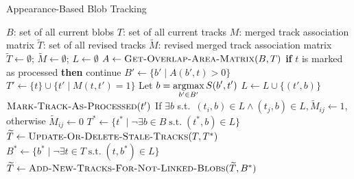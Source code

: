 \renewcommand{\algorithmicrequire}{\textbf{Input:}}
\renewcommand{\algorithmicensure}{\textbf{Output:}}
\renewcommand{\algorithmicforall}{\textbf{for each}}
\begin{algorithm}
\caption{Appearance-Based Blob Tracking}
\label{blob-tracking-algorithm}
\begin{algorithmic}
  \REQUIRE $B$: set of all current blobs
  \REQUIRE $T$: set of all current tracks
  \REQUIRE $M$: merged track association matrix
  \ENSURE $\widetilde{T}$: set of all revised tracks
  \ENSURE $\widetilde{M}$: revised merged track association matrix
  \STATE $\widetilde{T} \gets \emptyset$; $\widetilde{M} \gets \emptyset$; $L \gets \emptyset$
  \STATE $A \gets \textsc{Get-Overlap-Area-Matrix}(B, T)$
    \STATE \textbf{if} $t$ is marked as processed \textbf{then} continue
    \STATE $B' \gets \{ b' \mid A(b', t) > 0 \}$ 
    \STATE $T' \gets \{ t \} \cup \{ t' \mid M(t, t') = 1 \}$ 
        \STATE Let $b = \displaystyle\operatorname*{argmax}_{b' \in B'} S(b', t')$
	\STATE $L \gets L \cup \{ (t', b) \}$
	\STATE $\textsc{Mark-Track-As-Processed}(t')$
      \ENDFOR
    \ENDIF
  \ENDFOR
    \STATE If $\exists b$ s.t.\ $(t_i, b) \in L \wedge (t_j, b) \in L, \widetilde{M}_{ij} \gets 1$, otherwise $\widetilde{M}_{ij} \gets 0$
  \ENDFOR
  \STATE $T^* \gets \{ t^* \mid \neg\exists b \in B \;\text{s.t.}\; (t^*,b) \in L \}$ 
  \STATE $\widetilde{T} \gets \textsc{Update-Or-Delete-Stale-Tracks}(T,T^*)$
  \STATE $B^* \gets \{ b^* \mid \neg \exists t \in T \;\text{s.t.}\; (t, b^*) \in L \}$ 
  \STATE $\widetilde{T} \gets\textsc{Add-New-Tracks-For-Not-Linked-Blobs}(\widetilde{T},B^*)$
\end{algorithmic}
\end{algorithm}

